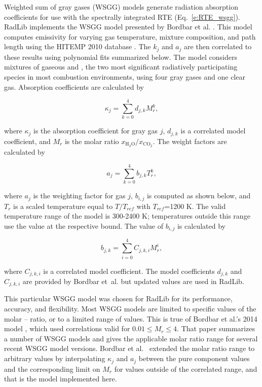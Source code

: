 \documentclass[preprint,12pt]{elsarticle}
\begin{document}
    Weighted sum of gray gases (WSGG) models generate radiation absorption coefficients for use with the spectrally integrated RTE (Eq.~\ref{e:RTE_wsgg}).
    RadLib implements the WSGG model presented by Bordbar et al. \citep{Bordbar_2014,Bordbar_2020}. This model computes emissivity for varying gas temperature, mixture composition, and path length using the HITEMP 2010 database \cite{Rothman_2010}. The $k_j$ and $a_j$ are then correlated to these results using polynomial fits summarized below. The model considers mixtures of gaseous  and , the two most significant radiatively participating species in most combustion environments, using four gray gases and one clear gas. Absorption coefficients are calculated by
%
    \begin{linenomath}
        \begin{equation}
            \kappa_j=\sum_{k=0}^{4}d_{j,k}M_r^k,
        \end{equation}
    \end{linenomath}
%
    where $\kappa_j$ is the absorption coefficient for gray gas $j$, $d_{j,k}$ is a correlated model coefficient, and $M_r$ is the molar ratio $x_{\mathrm{H_2O}}/x_{\mathrm{CO_2}}$. The weight factors are calculated by
%
    \begin{linenomath}
        \begin{equation}
            a_j=\sum_{k=0}^{4}b_{j,k}T_r^k,
        \end{equation}
    \end{linenomath}
%
    where $a_j$ is the weighting factor for gas $j$, $b_{i,j}$ is computed as shown below,  and $T_r$ is a scaled temperature equal to $T/T_{ref}$ with $T_{ref}$=1200 K. The valid temperature range of the model is 300-2400 K; temperatures outside this range use the value at the respective bound. The value of $b_{i,j}$ is calculated by
%
    \begin{linenomath}
        \begin{equation}
            b_{j,k}=\sum_{i=0}^{4}C_{j,k,i}M_r^i,
        \end{equation}
    \end{linenomath}
%
    where $C_{j,k,i}$ is a correlated model coefficient. The model coefficients $d_{j,k}$ and $C_{j,k,i}$ are provided by Bordbar et~al. \citep{Bordbar_2014,Bordbar_2020} but updated values are used in RadLib.

    This particular WSGG model was chosen for RadLib for its performance, accuracy, and flexibility. Most WSGG models are limited to specific values of the molar -- ratio, or to a limited range of values. This is true of Bordbar et al.'s 2014 model \cite{Bordbar_2014}, which used correlations valid for $0.01\le M_r\le4$. That paper summarizes a number of WSGG models and gives the applicable molar ratio range for several recent WSGG model versions.
    Bordbar et al.~\citep{Bordbar_2020} extended the molar ratio range to arbitrary values by interpolating $\kappa_j$ and $a_j$ between the pure component values and the corresponding limit on $M_r$ for values outside of the correlated range, and that is the model implemented here.
\end{document}
